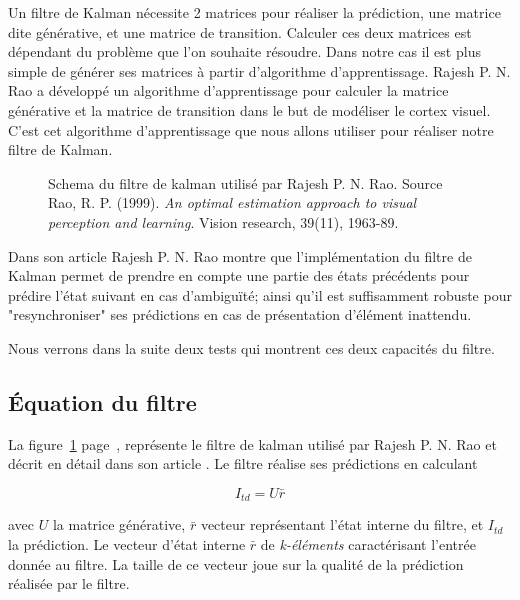 Un filtre de Kalman nécessite 2 matrices pour réaliser la prédiction, une
matrice dite générative, et une matrice de transition\cite{Rao1999}. Calculer
ces deux matrices est dépendant du problème que l'on souhaite résoudre. Dans
notre cas il est plus simple de générer ses matrices à partir d'algorithme
d'apprentissage. Rajesh P. N. Rao a développé un algorithme d'apprentissage
pour calculer la matrice générative et la matrice de transition dans le but de
modéliser le cortex visuel\cite{Rao1999}. C'est cet algorithme d'apprentissage
que nous allons utiliser pour réaliser notre filtre de Kalman.

\begin{figure}[ht]
   \begin{center}
   \end{center}
   \caption[Schema du filtre de kalman]{Schema du filtre de kalman utilisé par
   Rajesh P. N. Rao. Source Rao, R. P. (1999). \textit{An optimal estimation
   approach to visual perception and learning}. Vision research, 39(11),
   1963-89. \cite{Rao1999}}
   \label{fig:filtre_kalman}
\end{figure}

Dans son article\cite{Rao1999} Rajesh P. N. Rao montre que l'implémentation du
filtre de Kalman permet de prendre en compte une partie des états précédents
pour prédire l'état suivant en cas d'ambiguïté; ainsi qu'il est suffisamment
robuste pour "resynchroniser" ses prédictions en cas de présentation d'élément
inattendu.

Nous verrons dans la suite deux tests qui montrent ces deux capacités du filtre.

\subsection{Équation du filtre} %
\label{sub:Équation du filtre}

La figure~\ref{fig:filtre_kalman} page~\pageref{fig:filtre_kalman}, représente
le filtre de kalman utilisé par Rajesh P. N. Rao et décrit en détail dans son
article \cite{Rao1999}. Le filtre réalise ses prédictions en calculant

\[ I_{td} = U\bar{r} \]

avec $U$ la matrice générative, $\bar{r}$ vecteur représentant l'état interne
du filtre, et $I_{td}$ la prédiction. Le vecteur d'état interne $\bar{r}$ de
\textit{k-éléments} caractérisant l'entrée donnée au filtre. La taille de ce
vecteur joue sur la qualité de la prédiction réalisée par le filtre.

